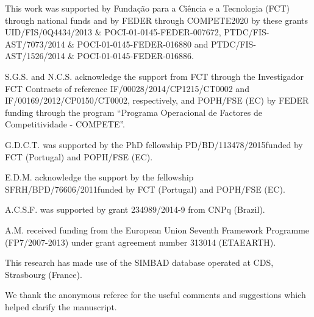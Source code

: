 \documentclass{aa}
\begin{document}
\begin{acknowledgements}

This work was supported by Funda\c{c}\~ao para a Ci\^encia e a Tecnologia (FCT)
through national funds and by FEDER through COMPETE2020 by these grants
UID/FIS/0Q4434/2013 \& POCI-01-0145-FEDER-007672, PTDC/FIS-AST/7073/2014 \&
POCI-01-0145-FEDER-016880 and PTDC/FIS-AST/1526/2014 \& POCI-01-0145-FEDER-016886.

S.G.S. and N.C.S. acknowledge the support from FCT through the Investigador FCT
Contracts of reference IF/00028/2014/CP1215/CT0002 and
IF/00169/2012/CP0150/CT0002, respectively, and POPH/FSE (EC) by FEDER funding
through the program “Programa Operacional de Factores de Competitividade -
COMPETE”.

G.D.C.T. was supported by the PhD fellowship PD/BD/113478/2015funded by FCT
(Portugal) and POPH/FSE (EC).

E.D.M. acknowledge the support by the fellowship SFRH/BPD/76606/2011funded by
FCT (Portugal) and POPH/FSE (EC).

A.C.S.F. was supported by grant 234989/2014-9 from CNPq (Brazil).

A.M. received funding from the European Union Seventh Framework Programme
(FP7/2007-2013) under grant agreement number 313014 (ETAEARTH).

This research has made use of the SIMBAD database operated at CDS, Strasbourg
(France).

We thank the anonymous referee for the useful comments and suggestions which
helped clarify the manuscript.

\end{acknowledgements}




\end{document}
